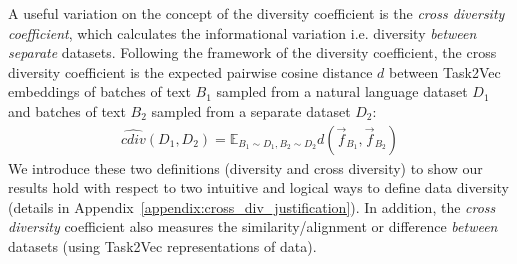A useful variation on the concept of the diversity coefficient is the \textit{cross diversity coefficient}, which calculates the informational variation i.e. diversity \textit{between} \textit{separate} datasets. 
Following the framework of the diversity coefficient, the cross diversity coefficient is the expected pairwise cosine distance $d$ between Task2Vec embeddings of batches of text $B_1$ sampled from a natural language dataset $D_1$ and batches of text $B_2$ sampled from a separate dataset $D_2$:
\begin{equation*}
\begin{aligned}
    \hat{cdiv}(D_1, D_2) =
    \mathbb{E}_{B_1 \sim D_1, B_2 \sim D_2} 
     d( \vec{f}_{B_1}, \vec{f}_{B_2} )
\end{aligned}
\end{equation*}
We introduce these two definitions (diversity and cross diversity) to show our results hold with respect to two intuitive and logical ways to define data diversity (details in Appendix~\ref{appendix:cross_div_justification}).
In addition, the \textit{cross diversity} coefficient also measures the similarity/alignment or difference \textit{between} datasets (using Task2Vec representations of data).


